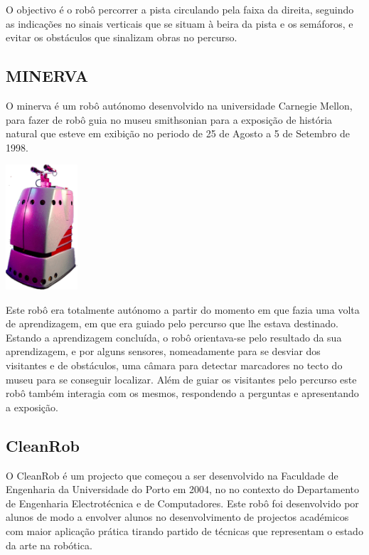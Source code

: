 O objectivo é o robô percorrer a pista circulando pela faixa da direita, seguindo
as indicações no sinais verticais que se situam à beira da pista e os semáforos,
e evitar os obstáculos que sinalizam obras no percurso.


\subsection{MINERVA}
O minerva é um robô autónomo desenvolvido na universidade Carnegie Mellon, para
fazer de robô guia no museu smithsonian para a exposição de história natural que
esteve em exibição no periodo de 25 de Agosto a 5 de Setembro de 1998.

\begin{center}
	\includegraphics[width=0.20\textwidth]{figures/minerva.png}
	\label{fig:4}
\end{center}

Este robô era totalmente autónomo a partir do momento em que fazia uma volta de
aprendizagem, em que era guiado pelo percurso que lhe estava destinado. Estando
a aprendizagem concluída, o robô orientava-se pelo resultado da sua aprendizagem,
e por alguns sensores, nomeadamente para se desviar dos visitantes e de obstáculos,
uma câmara para detectar marcadores no tecto do museu para se conseguir localizar.
Além de guiar os visitantes pelo percurso este robô também interagia com os mesmos,
respondendo a perguntas e apresentando a exposição.

\subsection{CleanRob}

O CleanRob é um projecto que começou a ser desenvolvido na Faculdade de Engenharia da 
Universidade do Porto em 2004, no no contexto do Departamento de Engenharia
Electrotécnica e de Computadores. Este robô foi desenvolvido por alunos de modo a
envolver alunos no desenvolvimento de projectos académicos com maior aplicação prática
tirando partido de técnicas que representam o estado da arte na robótica.

